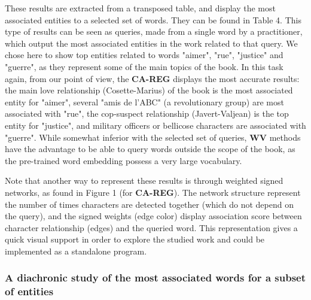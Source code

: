 \documentclass[
twocolumn,
]{ceurart}
\begin{document}
These results are extracted from a transposed table, and display the most associated entities to a selected set of words. They can be found in Table 4. This type of results can be seen as queries, made from a single word by a practitioner, which output the most associated entities in the work related to that query. We chose here to show top entities related to words "aimer", "rue", "justice" and "guerre", as they represent some of the main topics of the book. In this task again, from our point of view, the \textbf{CA-REG} displays the most accurate results: the main love relationship (Cosette-Marius) of the book is the most associated entity for "aimer", several "amis de l'ABC" (a revolutionary group) are most associated with "rue", the cop-suspect relationship (Javert-Valjean) is the top entity for "justice", and military officers or bellicose characters are associated with "guerre". While somewhat inferior with the selected set of queries, \textbf{WV} methods have the advantage to be able to query words outside the scope of the book, as the pre-trained word embedding possess a very large vocabulary.

Note that another way to represent these results is through weighted signed networks, as found in Figure 1 (for \textbf{CA-REG}). The network structure represent the number of times characters are detected together (which do not depend on the query), and the signed weights (edge color) display association score between character relationship (edges) and the queried word. This representation gives a quick visual support in order to explore the studied work and could be implemented as a standalone program.


\subsubsection{A diachronic study of the most associated words for a subset of entities}
\label{diachronic}
\end{document}
